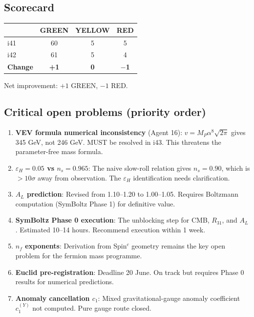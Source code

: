 \documentclass[11pt,a4paper]{article}
\newcommand{\GREEN}{\textcolor{dfdgreen}{\textbf{GREEN}}}
\newcommand{\YELLOW}{\textcolor{dfdyellow}{\textbf{YELLOW}}}
\newcommand{\RED}{\textcolor{dfdred}{\textbf{RED}}}
\begin{document}
\subsection{Scorecard}

\begin{center}
\begin{tabular}{lccc}
\toprule
& \textbf{\GREEN} & \textbf{\YELLOW} & \textbf{\RED} \\
\midrule
i41 & 60 & 5 & 5 \\
i42 & 61 & 5 & 4 \\
\textbf{Change} & \textbf{+1} & \textbf{0} & \textbf{$-$1} \\
\bottomrule
\end{tabular}
\end{center}

Net improvement: $+1$ GREEN, $-1$ RED.

\subsection{Critical open problems (priority order)}

\begin{enumerate}
\item \textbf{VEV formula numerical inconsistency} (Agent 16): $v = M_P \alpha^8 \sqrt{2\pi}$ gives 345 GeV, not 246 GeV. MUST be resolved in i43. This threatens the parameter-free mass formula.

\item \textbf{$\varepsilon_H = 0.05$ vs $n_s = 0.965$}: The naive slow-roll relation gives $n_s = 0.90$, which is $>10\sigma$ away from observation. The $\varepsilon_H$ identification needs clarification.

\item \textbf{$A_L$ prediction}: Revised from 1.10--1.20 to 1.00--1.05. Requires Boltzmann computation (SymBoltz Phase 1) for definitive value.

\item \textbf{SymBoltz Phase 0 execution}: The unblocking step for CMB, $R_{31}$, and $A_L$. Estimated 10--14 hours. Recommend execution within 1 week.

\item \textbf{$n_f$ exponents}: Derivation from Spin$^c$ geometry remains the key open problem for the fermion mass programme.

\item \textbf{Euclid pre-registration}: Deadline 20 June. On track but requires Phase 0 results for numerical predictions.

\item \textbf{Anomaly cancellation $c_1$}: Mixed gravitational-gauge anomaly coefficient $c_1^{(Y)}$ not computed. Pure gauge route closed.
\end{enumerate}
\end{document}
